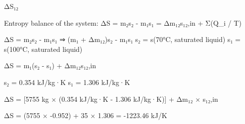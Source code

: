 ΔS₁₂  

Entropy balance of the system:  
ΔS = m₂s₂ - m₁s₁ = Δm₁₂s₁₂,in + Σ(Q_i / T)  

ΔS = m₂s₂ - m₁s₁ ⇒ (m₁ + Δm₁₂)s₂ - m₁s₁  
s₂ = s(70°C, saturated liquid)  
s₁ = s(100°C, saturated liquid)  

ΔS = m₁(s₂ - s₁) + Δm₁₂s₁₂,in  

s₂ = 0.354 kJ/kg·K  
s₁ = 1.306 kJ/kg·K  

ΔS = [5755 kg × (0.354 kJ/kg·K - 1.306 kJ/kg·K)] + Δm₁₂ × s₁₂,in  

ΔS = (5755 × -0.952) + 35 × 1.306 = -1223.46 kJ/K